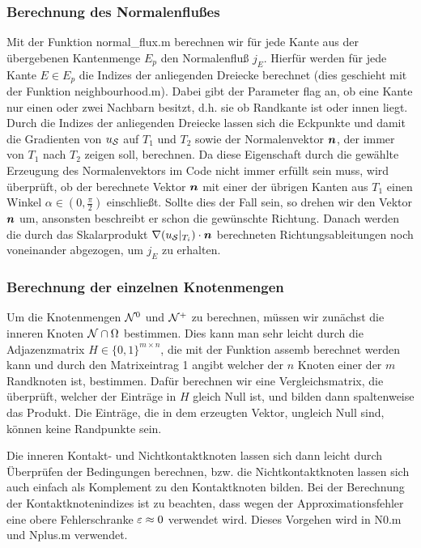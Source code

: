\subsubsection{Berechnung des Normalenflußes}

Mit der Funktion {\ttfamily normal_flux.m} berechnen wir für jede Kante aus der übergebenen Kantenmenge $E_p$ den Normalenfluß $j_E$. Hierfür werden  für jede Kante $E \in E_p$ die Indizes der anliegenden Dreiecke berechnet (dies geschieht mit der Funktion {\ttfamily neighbourhood.m}). Dabei gibt der Parameter {\ttfamily flag} an, ob eine Kante nur einen oder zwei Nachbarn besitzt, d.h. sie ob Randkante ist oder innen liegt. Durch die Indizes der anliegenden Dreiecke lassen sich die Eckpunkte und damit die Gradienten von $u_{\mathcal S}$ auf $T_1$ und $T_2$ sowie der Normalenvektor $\boldsymbol n$, der immer von $T_1$ nach $T_2$ zeigen soll, berechnen. Da diese Eigenschaft durch die gewählte Erzeugung des Normalenvektors im Code  nicht immer erfüllt sein muss, wird überprüft, ob der berechnete Vektor $\boldsymbol n$ mit einer der übrigen Kanten aus $T_1$ einen Winkel $\alpha \in (0,\frac \pi2)$ einschließt. Sollte dies der Fall sein, so drehen wir den Vektor $\boldsymbol n$ um, ansonsten beschreibt er schon die gewünschte Richtung. Danach werden die durch das Skalarprodukt $\nabla (u_{\mathcal S}|_{T_i}) \cdot \boldsymbol n$ berechneten Richtungsableitungen noch voneinander abgezogen, um $j_E$ zu erhalten.



\subsubsection{Berechnung der einzelnen Knotenmengen}

Um die Knotenmengen $\mathcal N^0$ und $\mathcal N^+$ zu berechnen, müssen wir zunächst die inneren Knoten $\mathcal N\cap \Omega$ bestimmen. Dies kann man sehr leicht durch die Adjazenzmatrix $H \in \{0,1\}^{m\times n}$, die mit der Funktion {\ttfamily assemb} berechnet werden kann und durch den Matrixeintrag 1 angibt welcher der $n$ Knoten einer der $m$ Randknoten ist, bestimmen. Dafür berechnen wir eine Vergleichsmatrix, die überprüft, welcher der Einträge in $H$ gleich Null ist, und bilden dann spaltenweise das Produkt. Die Einträge, die in dem erzeugten Vektor, ungleich Null sind, können keine Randpunkte sein.

Die inneren Kontakt- und Nichtkontaktknoten lassen sich dann leicht durch Überprüfen der Bedingungen berechnen, bzw. die Nichtkontaktknoten lassen sich auch einfach als Komplement zu den Kontaktknoten bilden. Bei der Berechnung der Kontaktknotenindizes ist zu beachten, dass wegen der Approximationsfehler eine obere Fehlerschranke $\varepsilon \approx 0$ verwendet wird. Dieses Vorgehen wird in {\ttfamily N0.m} und {\ttfamily Nplus.m} verwendet.

